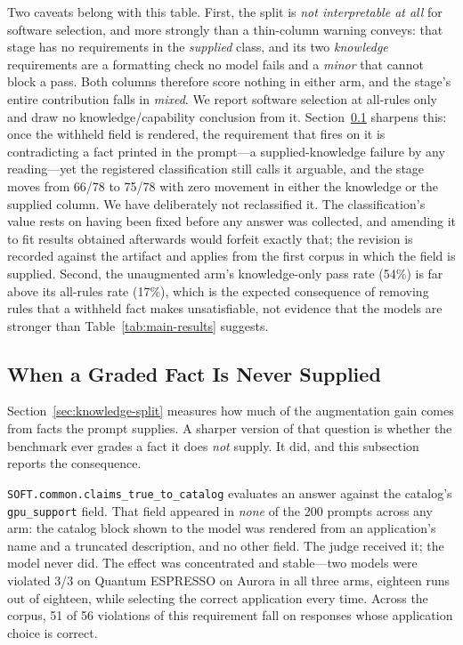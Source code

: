 \documentclass[conference]{IEEEtran}
\begin{document}
Two caveats belong with this table. First, the split is \emph{not interpretable at all} for software selection, and more strongly than a thin-column warning conveys: that stage has no requirements in the \emph{supplied} class, and its two \emph{knowledge} requirements are a formatting check no model fails and a \emph{minor} that cannot block a pass. Both columns therefore score nothing in either arm, and the stage's entire contribution falls in \emph{mixed}. We report software selection at all-rules only and draw no knowledge/capability conclusion from it. Section~\ref{sec:withheld} sharpens this: once the withheld field is rendered, the requirement that fires on it is contradicting a fact printed in the prompt---a supplied-knowledge failure by any reading---yet the registered classification still calls it arguable, and the stage moves from 66/78 to 75/78 with zero movement in either the knowledge or the supplied column. We have deliberately not reclassified it. The classification's value rests on having been fixed before any answer was collected, and amending it to fit results obtained afterwards would forfeit exactly that; the revision is recorded against the artifact and applies from the first corpus in which the field is supplied. Second, the unaugmented arm's knowledge-only pass rate (54\%) is far above its all-rules rate (17\%), which is the expected consequence of removing rules that a withheld fact makes unsatisfiable, not evidence that the models are stronger than Table~\ref{tab:main-results} suggests.

\subsection{When a Graded Fact Is Never Supplied}\label{sec:withheld}

Section~\ref{sec:knowledge-split} measures how much of the augmentation gain comes from facts the prompt supplies. A sharper version of that question is whether the benchmark ever grades a fact it does \emph{not} supply. It did, and this subsection reports the consequence.

\texttt{SOFT.common.claims\_true\_to\_catalog} evaluates an answer against the catalog's \texttt{gpu\_support} field. That field appeared in \emph{none} of the 200 prompts across any arm: the catalog block shown to the model was rendered from an application's name and a truncated description, and no other field. The judge received it; the model never did. The effect was concentrated and stable---two models were violated 3/3 on Quantum ESPRESSO on Aurora in all three arms, eighteen runs out of eighteen, while selecting the correct application every time. Across the corpus, 51 of 56 violations of this requirement fall on responses whose application choice is correct.
\end{document}
